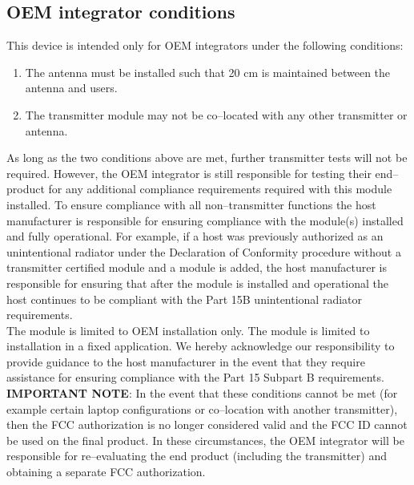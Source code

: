 \documentclass[11pt]{article}
\begin{document}
\subsection{OEM integrator conditions}
This device is intended only for OEM integrators under the following conditions:
\begin{enumerate}
	\item The antenna must be installed such that 20 cm is maintained between the antenna and users.
	\item The transmitter module may not be co–located with any other transmitter or antenna.
\end{enumerate}

As long as the two conditions above are met, further transmitter tests will not be required. However, the OEM integrator is still responsible for testing their end–product for any additional compliance requirements required with this module installed. To ensure compliance with all non–transmitter functions the host manufacturer is responsible for ensuring compliance with the module(s) installed and fully operational. For example, if a host  was previously authorized as an unintentional radiator under the Declaration of Conformity procedure without a 
transmitter certified module and a module is added, the host manufacturer is responsible for ensuring that after the module is installed and operational the host continues to be compliant with the Part 15B unintentional radiator requirements.\\

The module is limited to OEM installation only. The module is limited to installation in a fixed application. We hereby acknowledge our responsibility to provide guidance to the host manufacturer in the event that they require assistance for ensuring compliance with the Part 15 Subpart B requirements.\\

{\bf IMPORTANT NOTE}: In the event that these conditions cannot be met (for example certain laptop configurations or co–location with another transmitter), then the FCC authorization is no longer considered valid and the FCC ID cannot be used on the final product. In these circumstances, the OEM integrator will be responsible for re–evaluating the end product (including the transmitter) and obtaining a separate FCC authorization. 
\end{document}
